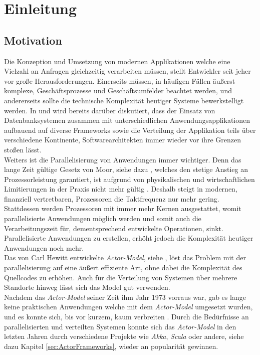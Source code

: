 \chapter{Einleitung}\label{cha:introduction}
\section{Motivation}\label{sec:introduction:motivation}
Die Konzeption und Umsetzung von modernen Applikationen welche eine Vielzahl an Anfragen gleichzeitig verarbeiten müssen, stellt Entwickler seit jeher vor große Herausforderungen. Einerseits müssen, in häufigen Fällen äußerst komplexe, Geschäftsprozesse und Geschäftsumfelder beachtet werden, und andererseits sollte die technische Komplexität heutiger Systeme bewerkstelligt werden. In \cite{Vernon2015ReactiveAkka} und \cite{Evans2004Domain-drivenSoftware} wird bereits darüber diskutiert, dass der Einsatz von Datenbanksystemen zusammen mit unterschiedlichen Anwendungsapplikationen aufbauend auf diverse Frameworks  sowie die Verteilung der Applikation teils über verschiedene Kontinente,  Softwarearchitekten immer wieder vor ihre Grenzen stoßen lässt. \\
Weiters ist die Parallelisierung von Anwendungen immer wichtiger. Denn das lange Zeit gültige Gesetz von Moor, siehe dazu \cite{moore1965moore}, welches den stetige Anstieg an Prozessorleistung garantiert, ist aufgrund von physikalischen und wirtschaftlichen Limitierungen in der Praxis nicht mehr gültig \citep{mann2000end}. Deshalb steigt in modernen, finanziell vertretbaren, Prozessoren die Taktfrequenz nur mehr gering. Stattdessen werden Prozessoren mit immer mehr Kernen ausgestattet, womit parallelisierte Anwendungen möglich werden und somit auch die Verarbeitungszeit für, dementsprechend entwickelte Operationen, sinkt. Parallelisierte Anwendungen zu erstellen, erhöht jedoch die Komplexität heutiger Anwendungen noch mehr. \\
Das von Carl Hewitt entwickelte \textit{Actor-Model}, siehe \cite{Hewitt1973AIntelligence}, löst das Problem mit der parallelisierung auf eine äußert effiziente Art, ohne dabei die Komplexität des Quellcodes zu erhöhen. Auch für die Verteilung von Systemen über mehrere Standorte hinweg lässt sich das Model gut verwenden. \\
Nachdem das \textit{Actor-Model} seiner Zeit ihm Jahr 1973 vorraus war, gab es lange keine praktischen Anwendungen welche mit dem \textit{Actor-Model} umgesetzt wurden, und es konnte sich, bis vor kurzem, kaum verbreiten \citep{mackay1997has}. Durch die Bedürfnisse an parallelisierten und verteilten Systemen konnte sich das \textit{Actor-Model} in den letzten Jahren durch verschiedene Projekte wie \textit{Akka}, \textit{Scala} oder andere, siehe dazu Kapitel \ref{sec:ActorFrameworks}, wieder an popularität gewinnen.

